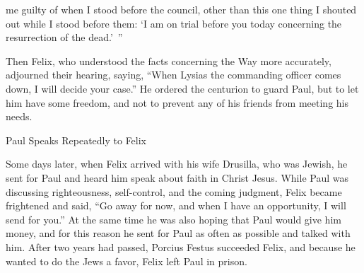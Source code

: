 {me
guilty
of when
I stood
before
the council,
other than
this
one thing
I shouted out
while I stood
before
them: ‘I
am on trial
before
you
today
concerning
the resurrection
of the dead.’ ”
\par }{\PP {}Then Felix,
who understood
the facts concerning
the Way
more accurately,
adjourned
their hearing,
saying,
“When
Lysias
the commanding officer
comes down,
I will decide your case.”
He ordered
the centurion
to guard
Paul, but to let him
have
some freedom,
and
not
to prevent
any of his
friends
from meeting
his
needs.
\par }{\SH Paul Speaks Repeatedly to Felix
\par }{\PP {}Some
days
later,
when
Felix
arrived
with
his
wife
Drusilla,
who was
Jewish,
he sent for
Paul
and
heard
him
speak about
faith
in
Christ
Jesus.
While
Paul was discussing
righteousness,
self-control,
and
the coming
judgment,
Felix
became
frightened
and said,
“Go away
for now,
and when I have
an opportunity,
I will send for
you.”
At the same time
he was also
hoping
that
Paul would give
him
money,
and for this reason
he
sent for
Paul
as often as possible
and talked
with him.
After two years
had passed,
Porcius
Festus
succeeded
Felix,
and
because he wanted
to do
the Jews
a favor,
Felix
left
Paul
in prison.

}
